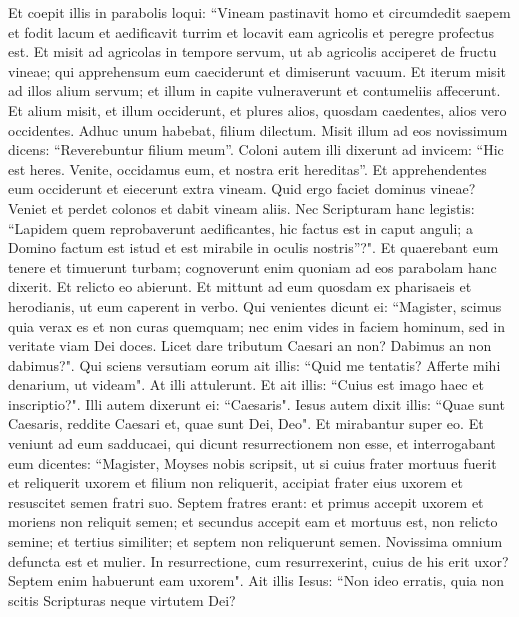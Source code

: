 \begin{biblechapter}  
\verse Et coepit illis in parabolis loqui: “Vineam pastinavit homo et circumdedit saepem et fodit lacum et aedificavit turrim et locavit eam agricolis et peregre profectus est. 
\verse Et misit ad agricolas in tempore servum, ut ab agricolis acciperet de fructu vineae; 
\verse qui apprehensum eum caeciderunt et dimiserunt vacuum. 
\verse Et iterum misit ad illos alium servum; et illum in capite vulneraverunt et contumeliis affecerunt. 
\verse Et alium misit, et illum occiderunt, et plures alios, quosdam caedentes, alios vero occidentes. 
\verse Adhuc unum habebat, filium dilectum. Misit illum ad eos novissimum dicens: “Reverebuntur filium meum”. 
\verse Coloni autem illi dixerunt ad invicem: “Hic est heres. Venite, occidamus eum, et nostra erit hereditas”. 
\verse Et apprehendentes eum occiderunt et eiecerunt extra vineam. 
\verse Quid ergo faciet dominus vineae? Veniet et perdet colonos et dabit vineam aliis. 
\verse Nec Scripturam hanc legistis: “Lapidem quem reprobaverunt aedificantes, hic factus est in caput anguli; 
\verse a Domino factum est istud et est mirabile in oculis nostris”?". 
\verse Et quaerebant eum tenere et timuerunt turbam; cognoverunt enim quoniam ad eos parabolam hanc dixerit. Et relicto eo abierunt. 
\verse Et mittunt ad eum quosdam ex pharisaeis et herodianis, ut eum caperent in verbo. 
\verse Qui venientes dicunt ei: “Magister, scimus quia verax es et non curas quemquam; nec enim vides in faciem hominum, sed in veritate viam Dei doces. Licet dare tributum Caesari an non? Dabimus an non dabimus?". 
\verse Qui sciens versutiam eorum ait illis: “Quid me tentatis? Afferte mihi denarium, ut videam". 
\verse At illi attulerunt. Et ait illis: “Cuius est imago haec et inscriptio?". Illi autem dixerunt ei: “Caesaris". 
\verse Iesus autem dixit illis: “Quae sunt Caesaris, reddite Caesari et, quae sunt Dei, Deo". Et mirabantur super eo. 
\verse Et veniunt ad eum sadducaei, qui dicunt resurrectionem non esse, et interrogabant eum dicentes: 
\verse “Magister, Moyses nobis scripsit, ut si cuius frater mortuus fuerit et reliquerit uxorem et filium non reliquerit, accipiat frater eius uxorem et resuscitet semen fratri suo. 
\verse Septem fratres erant: et primus accepit uxorem et moriens non reliquit semen; 
\verse et secundus accepit eam et mortuus est, non relicto semine; et tertius similiter;  
\verse et septem non reliquerunt semen. Novissima omnium defuncta est et mulier.  
\verse In resurrectione, cum resurrexerint, cuius de his erit uxor? Septem enim habuerunt eam uxorem". 
\verse Ait illis Iesus: “Non ideo erratis, quia non scitis Scripturas neque virtutem Dei? 

\end{biblechapter}
